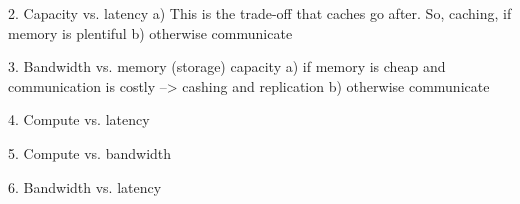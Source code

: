 2. Capacity vs. latency
   a) This is the trade-off that caches go after. So, caching, if memory is plentiful
   b) otherwise communicate


3. Bandwidth vs. memory (storage) capacity
  a) if memory is cheap and communication is costly --> cashing and replication
  b) otherwise communicate
 
4. Compute vs. latency

5. Compute vs. bandwidth
 
6. Bandwidth vs. latency

